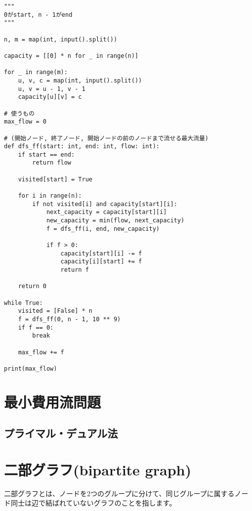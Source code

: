 \documentclass{jlreq}
\begin{document}
\begin{lstlisting}[caption=フォード・ファルカーソン法の実装, label=ford_fulkerson, frame=TRBL, label={ford_fulkerson}]
"""
0がstart, n - 1がend
"""
  
n, m = map(int, input().split())

capacity = [[0] * n for _ in range(n)]

for _ in range(m):
    u, v, c = map(int, input().split())
    u, v = u - 1, v - 1
    capacity[u][v] = c

# 使うもの
max_flow = 0

# (開始ノード, 終了ノード, 開始ノードの前のノードまで流せる最大流量)
def dfs_ff(start: int, end: int, flow: int):
    if start == end:
        return flow
    
    visited[start] = True

    for i in range(n):
        if not visited[i] and capacity[start][i]:
            next_capacity = capacity[start][i]
            new_capacity = min(flow, next_capacity)
            f = dfs_ff(i, end, new_capacity)

            if f > 0:
                capacity[start][i] -= f
                capacity[i][start] += f
                return f
        
    return 0

while True:
    visited = [False] * n
    f = dfs_ff(0, n - 1, 10 ** 9)
    if f == 0:
        break

    max_flow += f

print(max_flow)
\end{lstlisting}

\section{最小費用流問題}

\subsection{プライマル・デュアル法}

\section{二部グラフ(bipartite graph)}
二部グラフとは、ノードを2つのグループに分けて、同じグループに属するノード同士は辺で結ばれていないグラフのことを指します。

\vspace{0.5cm}
\end{document}
